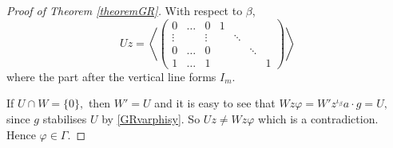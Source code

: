 \documentclass[a4paper,reqno,11pt]{amsart}
\theoremstyle{definition}
\theoremstyle{remark}
\numberwithin{equation}{section}
\begin{document}
\begin{proof}[Proof of Theorem {\rm \ref{theoremGR}}]
 With respect to $\beta$,
$$Uz= \left \langle 
\left(\begin{array}{ccc|ccccc}
 0        & \ldots & 0               &           1 & & &  \\
\vdots    &        &\vdots           &           & \ddots  & &  \\
0         & \ldots & 0               &            & &\ddots &  \\
1         & \ldots &  1              &           &  & & 1 
\end{array}\right)
\right \rangle$$
where the part after the vertical line forms $I_m.$

 If $U \cap W=\{0\},$ then $W'=U$ and it is easy to see that $Wz \varphi = W'z^{\iota_{\beta}}a \cdot g= U,$ since $g$ stabilises $U$ by \eqref{GRvarphisy}. So $Uz \ne Wz \varphi$ which is a contradiction. Hence $\varphi \in \Gamma.$
 

\end{proof}
\end{document}
